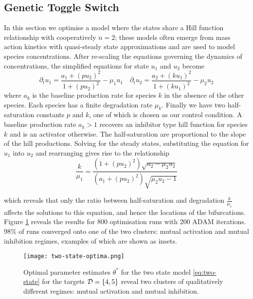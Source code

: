 \subsection{Genetic Toggle Switch}
In this section we optimise a model where the states share a Hill function relationship with cooperatively $n=2$; these models often emerge from mass action kinetics with quasi-steady state approximations and are used to model species concentrations. After re-scaling the equations governing the dynamics of concentrations, the simplified equations for state $u_1$ and $u_2$ become 
\begin{equation}
    \partial_t u_1 = \frac{ a_1 + (p u_2)^2}{ 1 + (p u_2)^2 } - \mu_1 u_1 \quad
    \partial_t u_2 = \frac{ a_2 + (k u_1)^2}{ 1 + (k u_1)^2 } - \mu_2 u_2
    \label{eq:two-state}
\end{equation}
where $a_k$ is the baseline production rate for species $k$ in the absence of the other species. Each species has a finite degradation rate $\mu_k$. Finally we have two half-saturation constants $p$ and $k$, one of which is chosen as our control condition. A baseline production rate $a_k>1$ recovers an inhibitor type hill function for species $k$ and is an activator otherwise. The half-saturation are proportional to the slope of the hill productions. Solving for the steady states,  substituting the equation for $u_1$ into $u_2$ and rearranging gives rise to the relationship
\begin{equation}
    \dfrac{k}{\mu_1} = \dfrac{(1 + (p u_2)^2) \sqrt{a_2 - \mu_2 u_2} }{ (a_1 + (p u_2)^2) \sqrt{ \mu_2 u_2 - 1 } }
    \label{eq:steady-states-simplified}
\end{equation}

which reveals that only the ratio between half-saturation and degradation $\frac{k}{\mu_1}$ affects the solutions to this equation, and hence the locations of the bifurcations. Figure \ref{fig:two-state-optima} reveals the results for 800 optimisation runs with 200 ADAM iterations. 98\% of runs converged onto one of the two clusters: mutual activation and mutual inhibition regimes, examples of which are shown as insets.
\begin{figure}
\centering
\texttt{[image: two-state-optima.png]}
\caption{Optimal parameter estimates $\theta^*$ for the two state model \eqref{eq:two-state} for the targets $\mathcal{D}=\{4,5\}$ reveal two clusters of qualitatively different regimes: mutual activation and mutual inhibition. }
\label{fig:two-state-optima}
\end{figure}

